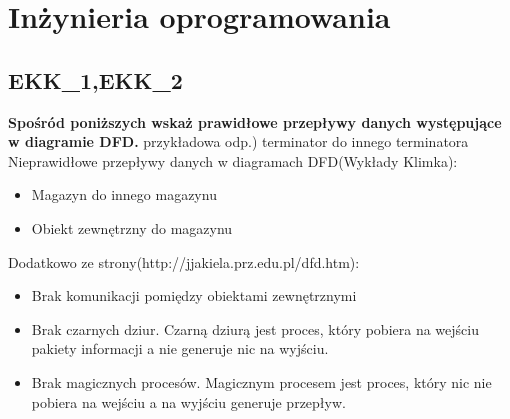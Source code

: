 
\chapter{Inżynieria oprogramowania}
\PartialToc




\setcounter{section}{247}
\section{EKK\_1,EKK\_2}
\textbf{Spośród poniższych wskaż prawidłowe przepływy danych występujące w diagramie DFD.}
przykładowa odp.) terminator do innego terminatora 
\\
Nieprawidłowe przepływy danych w diagramach DFD(Wykłady Klimka):
\begin{itemize}
\item Magazyn do innego magazynu
\item Obiekt zewnętrzny do magazynu
\end{itemize}
Dodatkowo ze strony(http://jjakiela.prz.edu.pl/dfd.htm):
\begin{itemize}
\item Brak komunikacji pomiędzy obiektami zewnętrznymi
\item Brak czarnych dziur. Czarną dziurą jest proces, który pobiera na wejściu pakiety informacji a nie generuje nic na wyjściu.
\item Brak magicznych procesów. Magicznym procesem jest proces, który nic nie pobiera na wejściu a na wyjściu generuje przepływ.
\end{itemize}
